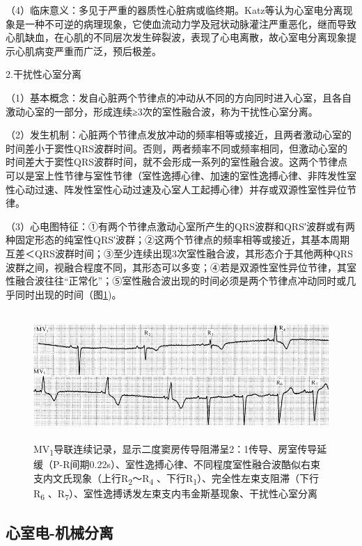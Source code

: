 （4）临床意义：多见于严重的器质性心脏病或临终期。Katz等认为心室电分离现象是一种不可逆的病理现象，它使血流动力学及冠状动脉灌注严重恶化，继而导致心肌缺血，在心肌的不同层次发生碎裂波，表现了心电离散，故心室电分离现象提示心肌病变严重而广泛，预后极差。

2.干扰性心室分离

（1）基本概念：发自心脏两个节律点的冲动从不同的方向同时进入心室，且各自激动心室的一部分，形成连续≥3次的室性融合波，称为干扰性心室分离。

（2）发生机制：心脏两个节律点发放冲动的频率相等或接近，且两者激动心室的时间差小于窦性QRS波群时间。否则，两者频率不同或频率相同，但激动心室的时间差大于窦性QRS波群时间，就不会形成一系列的室性融合波。这两个节律点可以是室上性节律与室性节律（室性逸搏心律、加速的室性逸搏心律、非阵发性室性心动过速、阵发性室性心动过速及心室人工起搏心律）并存或双源性室性异位节律。

（3）心电图特征：①有两个节律点激动心室所产生的QRS波群和QRS′波群或有两种固定形态的纯室性QRS′波群；②这两个节律点的频率相等或接近，其基本周期互差＜QRS波群时间；③至少连续出现3次室性融合波，其形态介于其他两种QRS波群之间，视融合程度不同，其形态可以多变；④若是双源性室性异位节律，其室性融合波往往“正常化”；⑤室性融合波出现的时间必须是两个节律点冲动同时或几乎同时出现的时间（图\ref{fig30-8})。

\begin{figure}[!htbp]
 \centering
 \includegraphics[width=5.58333in,height=1.91667in]{./images/Image00503.jpg}
 \captionsetup{justification=centering}
 \caption{MV\textsubscript{1}导联连续记录，显示二度窦房传导阻滞呈2：1传导、房室传导延缓（P-R间期0.22s）、室性逸搏心律、不同程度室性融合波酷似右束支内文氏现象（上行R\textsubscript{2}～R\textsubscript{4} 、下行R\textsubscript{1}）、完全性左束支阻滞（下行R\textsubscript{6} 、R\textsubscript{7}）、室性逸搏诱发左束支内韦金斯基现象、干扰性心室分离}
 \label{fig30-8}
  \end{figure} 


\protect\hypertarget{text00037.htmlux5cux23subid435}{}{}

\subsection{心室电-机械分离}


